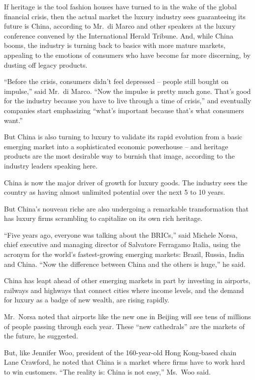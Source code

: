 ﻿\documentclass[12pt]{article}
\begin{document}
If heritage is the tool fashion houses have turned to in the wake of the global financial crisis,
then the actual market the luxury industry sees guaranteeing its future is China, according to
Mr.~di Marco and other speakers at the luxury conference convened by the International Herald
Tribune. And, while China booms, the industry is turning back to basics with more mature markets,
appealing to the emotions of consumers who have become far more discerning, by dusting off legacy
products.

``Before the crisis, consumers didn't feel depressed -- people still bought on impulse,'' said
Mr.~di Marco. ``Now the impulse is pretty much gone. That's good for the industry because you have
to live through a time of crisis,'' and eventually companies start emphasizing ``what's important
because that's what consumers want.''

But China is also turning to luxury to validate its rapid evolution from a basic emerging market
into a sophisticated economic powerhouse -- and heritage products are the most desirable way to
burnish that image, according to the industry leaders speaking here.

China is now the major driver of growth for luxury goods. The industry sees the country as having
almost unlimited potential over the next 5 to 10 years.

But China's nouveau riche are also undergoing a remarkable transformation that has luxury firms
scrambling to capitalize on its own rich heritage.

``Five years ago, everyone was talking about the BRICs,'' said Michele Norsa, chief executive and
managing director of Salvatore Ferragamo Italia, using the acronym for the world's fastest-growing
emerging markets: Brazil, Russia, India and China. ``Now the difference between China and the others
is huge,'' he said.

China has leapt ahead of other emerging markets in part by investing in airports, railways and
highways that connect cities where income levels, and the demand for luxury as a badge of new
wealth, are rising rapidly.

Mr.~Norsa noted that airports like the new one in Beijing will see tens of millions of people
passing through each year. These ``new cathedrals'' are the markets of the future, he suggested.

But, like Jennifer Woo, president of the 160-year-old Hong Kong-based chain Lane Crawford, he noted
that China is a market where firms have to work hard to win customers. ``The reality is: China is
not easy,'' Ms.~Woo said.
\end{document}
